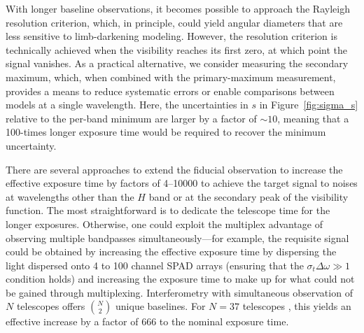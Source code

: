 \documentclass[linenumbers,trackchanges]{aastex701}
\begin{document}
With longer baseline observations, it becomes possible to approach the Rayleigh resolution criterion, which, in principle, could yield angular diameters that are less sensitive to limb-darkening modeling. However, the resolution criterion is technically achieved when the visibility reaches its first zero, at which point the signal vanishes. As a practical alternative, we consider measuring the secondary maximum, which, when combined with the primary-maximum measurement, provides a means to reduce systematic errors or enable comparisons between models at a single wavelength. 
Here, the uncertainties in $s$
in Figure~\ref{fig:sigma_s} relative to the per-band minimum are larger by a factor of $\sim 10$, meaning that
a 100-times longer exposure time would be required to recover the minimum uncertainty.

There are several approaches to extend the fiducial observation to increase the
effective exposure time by factors of 4--10000 to achieve the target signal to noises at wavelengths
other than the $H$ band or at the secondary peak of the visibility function.
The most straightforward is to dedicate the telescope time for the longer exposures.  Otherwise,
one could exploit the multiplex advantage of observing multiple bandpasses simultaneously---for example, the requisite signal could be obtained by increasing the effective exposure time by dispersing the light dispersed onto 4 to 100 channel SPAD arrays (ensuring that the $\sigma_t \Delta \omega \gg 1$ condition holds)
and increasing the exposure time to make up for
what could not be gained through multiplexing.
Interferometry with simultaneous observation of $N$ telescopes offers ${N \choose 2}$ unique baselines. For $N=37$ telescopes \citep[the number of Small-Sized Telescopes planned for the Cherenkov Telescope Array Observatory-South][]{2022SPIE12182E..0KT}, this yields an effective increase by a factor of 666 to the nominal exposure time. 
\end{document}
